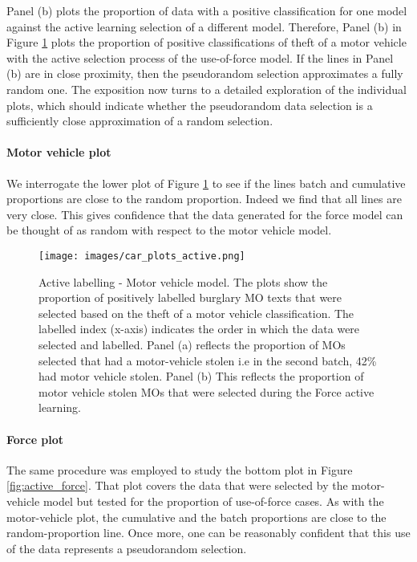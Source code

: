 Panel (b) plots the proportion of data with a positive classification for one model against the active learning selection of a different model. Therefore, Panel (b) in Figure \ref{fig:active_car}  plots the proportion of positive classifications of theft of a motor vehicle with the active selection process of the use-of-force model. If the lines in Panel (b) are in close proximity, then the pseudorandom selection approximates a fully random one. The exposition now turns to a detailed exploration of the individual plots, which should indicate whether the pseudorandom data selection is a sufficiently close approximation of a random selection. 


\paragraph{Motor vehicle plot}We interrogate the lower plot of Figure \ref{fig:active_car} to see if the lines batch and cumulative proportions are close to the random proportion. Indeed we find that all lines are very close. This gives confidence that the data generated for the force model can be thought of as random with respect to the motor vehicle model. 

\begin{figure}[!ht]
  \centering
    \texttt{[image: images/car\_plots\_active.png]}
    \caption[Active labelling - Motor vehicle model. ]{{Active labelling - Motor vehicle model.} The plots show the proportion of positively labelled burglary MO texts that were selected based on the theft of a motor vehicle classification. The labelled index (x-axis) indicates the order in which the data were selected and labelled. Panel (a) reflects the proportion of MOs selected that had a motor-vehicle stolen i.e in the second batch, 42\% had motor vehicle stolen. Panel (b) This reflects the proportion of motor vehicle stolen MOs that were selected during the Force active learning.}
    \label{fig:active_car}
\end{figure}


\paragraph{Force plot}  The same procedure was employed to study the bottom plot in Figure \ref{fig:active_force}. That plot covers the data that were selected by the motor-vehicle model but tested for the proportion of use-of-force cases. As with the motor-vehicle plot, the cumulative and the batch proportions are close to the random-proportion line. Once more, one can be reasonably confident that this use of the data represents a pseudorandom selection.

